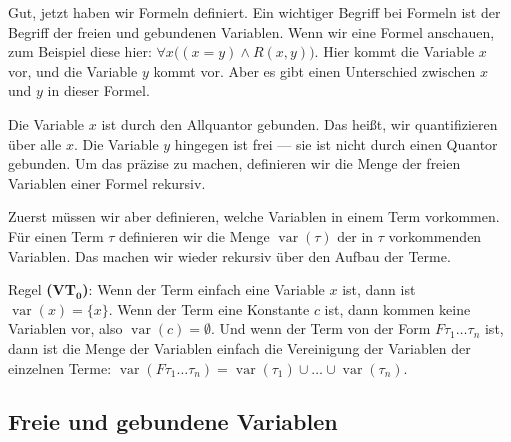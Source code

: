 \begin{spoken-clean}[01:03:37 - 01:05:22]
Gut, jetzt haben wir Formeln definiert. Ein wichtiger Begriff bei Formeln ist der Begriff der freien und gebundenen Variablen. Wenn wir eine Formel anschauen, zum Beispiel diese hier: $\forall x \bigl((x = y) \wedge R(x, y)\bigr)$. Hier kommt die Variable $x$ vor, und die Variable $y$ kommt vor. Aber es gibt einen Unterschied zwischen $x$ und $y$ in dieser Formel.

Die Variable $x$ ist durch den Allquantor gebunden. Das heißt, wir quantifizieren über alle $x$. Die Variable $y$ hingegen ist frei --- sie ist nicht durch einen Quantor gebunden. Um das präzise zu machen, definieren wir die Menge der freien Variablen einer Formel rekursiv.
\end{spoken-clean}

\begin{spoken-clean}[01:05:22 - 01:07:07]
Zuerst müssen wir aber definieren, welche Variablen in einem Term vorkommen. Für einen Term $\tau$ definieren wir die Menge $\operatorname{var}(\tau)$ der in $\tau$ vorkommenden Variablen. Das machen wir wieder rekursiv über den Aufbau der Terme.

Regel \textbf{(VT$_{\mathbf{0}}$)}: Wenn der Term einfach eine Variable $x$ ist, dann ist $\operatorname{var}(x) = \{x\}$. Wenn der Term eine Konstante $c$ ist, dann kommen keine Variablen vor, also $\operatorname{var}(c) = \emptyset$. Und wenn der Term von der Form $F \tau_1 \dots \tau_n$ ist, dann ist die Menge der Variablen einfach die Vereinigung der Variablen der einzelnen Terme: $\operatorname{var}(F \tau_1 \dots \tau_n) = \operatorname{var}(\tau_1) \cup \dots \cup \operatorname{var}(\tau_n)$.
\end{spoken-clean}

\subsection{Freie und gebundene Variablen}

\begin{math-stroke}
\end{math-stroke}

